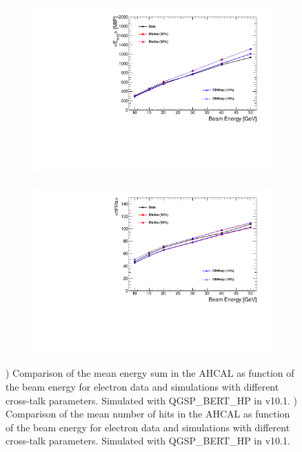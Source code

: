 \begin{figure}[htbp!]
	\centering
	\begin{subfigure}[t]{0.49\textwidth}
		\includegraphics[width=1.\linewidth]{../Thesis_Plots/Timing/Electrons/Plots/EsumElectrons_BeamEnergy.pdf}
		\caption{} \label{fig:EsumMeanElectron}
	\end{subfigure}
	\hfill
	\begin{subfigure}[t]{0.49\textwidth}
		\includegraphics[width=1.\linewidth]{../Thesis_Plots/Timing/Electrons/Plots/nHitsElectrons_BeamEnergy.pdf}
		\caption{} \label{fig:nHitsMeanElectron}
	\end{subfigure}
	\caption{) Comparison of the mean energy sum in the AHCAL as function of the beam energy for electron data and simulations with different cross-talk parameters. Simulated with QGSP\_BERT\_HP in \geant v10.1. ) Comparison of the mean number of hits in the AHCAL as function of the beam energy for electron data and simulations with different cross-talk parameters. Simulated with QGSP\_BERT\_HP in \geant v10.1.}
	\label{fig:eVal}
\end{figure}

